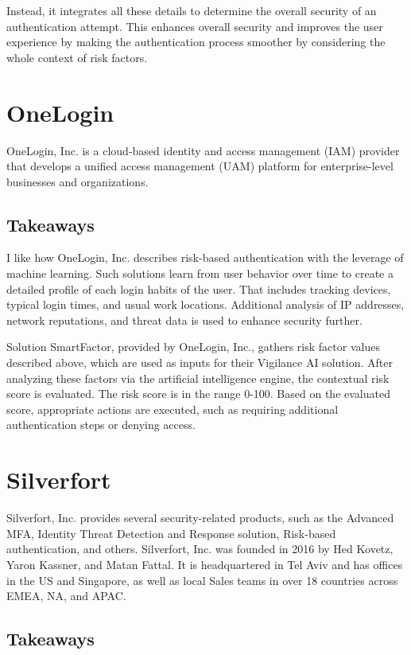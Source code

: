 Instead, it integrates all these details to determine the overall security of an authentication attempt.
This enhances overall security and improves the user experience by making the authentication process smoother by considering the whole context of risk factors. 

\newpage
\section{OneLogin}

OneLogin, Inc. is a cloud-based identity and access management (IAM) provider that develops a unified access management (UAM) platform for enterprise-level businesses and organizations. \cite{existing-onelogin}

\subsection*{Takeaways}
I like how OneLogin, Inc. describes risk-based authentication with the leverage of machine learning. 
Such solutions learn from user behavior over time to create a detailed profile of each login habits of the user.
That includes tracking devices, typical login times, and usual work locations.
Additional analysis of IP addresses, network reputations, and threat data is used to enhance security further.

Solution SmartFactor, provided by OneLogin, Inc., gathers risk factor values described above, which are used as inputs for their Vigilance AI solution.
After analyzing these factors via the artificial intelligence engine, the contextual risk score is evaluated.
The risk score is in the range 0-100.
Based on the evaluated score, appropriate actions are executed, such as requiring additional authentication steps or denying access.\cite{existing-onelogin} 

\newpage
\section{Silverfort}
Silverfort, Inc. provides several security-related products, such as the Advanced MFA, Identity Threat Detection and Response solution, Risk-based authentication, and others.
Silverfort, Inc. was founded in 2016 by Hed Kovetz, Yaron Kassner, and Matan Fattal.
It is headquartered in Tel Aviv and has offices in the US and Singapore, as well as local Sales teams in over 18 countries across EMEA, NA, and APAC.\cite{example_silverfort}

\subsection*{Takeaways}

